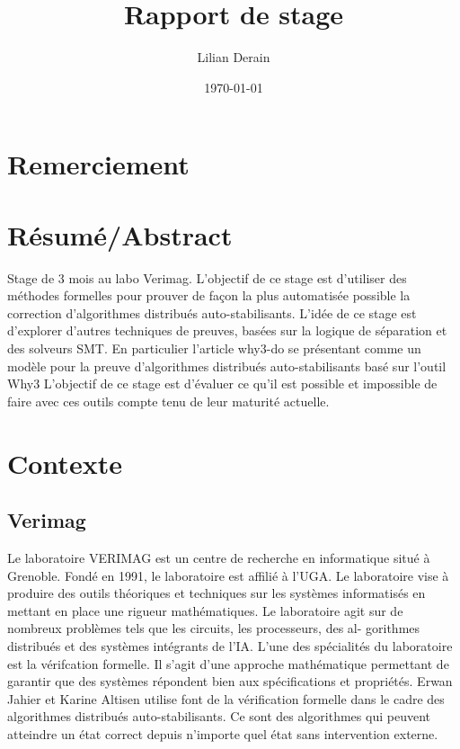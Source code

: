 \documentclass[11pt]{article}
\author{Lilian Derain}
\date{\today}
\title{Rapport de stage}
\begin{document}
\maketitle


\section{Remerciement}
\label{sec:org604d041}
\section{Résumé/Abstract}
\label{sec:org76c7e88}
Stage de 3 mois au labo Verimag.
L'objectif de ce stage est d'utiliser des méthodes formelles pour prouver de façon la plus automatisée possible la correction d'algorithmes distribués auto-stabilisants.
L'idée de ce stage est d'explorer d'autres techniques de preuves, basées sur la logique de séparation et  des solveurs SMT. 
En particulier l'article why3-do se présentant comme un modèle pour la preuve d'algorithmes distribués auto-stabilisants basé sur l'outil Why3  
L'objectif de ce stage  est d'évaluer ce qu'il est possible et impossible  de faire  avec ces  outils compte  tenu de  leur maturité actuelle.

\section{Contexte}
\label{sec:org8001d29}

\subsection{Verimag}
\label{sec:orge2e2943}

   Le laboratoire VERIMAG est un centre de recherche en informatique situé à Grenoble. Fondé
en 1991, le laboratoire est affilié à l’UGA. Le laboratoire vise à produire des outils théoriques
et techniques sur les systèmes informatisés en mettant en place une rigueur mathématiques.
Le laboratoire agit sur de nombreux problèmes tels que les circuits, les processeurs, des al-
gorithmes distribués et des systèmes intégrants de l’IA.
L’une des spécialités du laboratoire est la vérifcation formelle. Il s’agit d’une approche
mathématique permettant de garantir que des systèmes répondent bien aux spécifications
et propriétés. Erwan Jahier et Karine Altisen utilise font de la vérification formelle dans le 
cadre des algorithmes distribués auto-stabilisants. Ce sont des algorithmes qui peuvent 
atteindre un état correct depuis n'importe quel état sans intervention externe.
\end{document}

